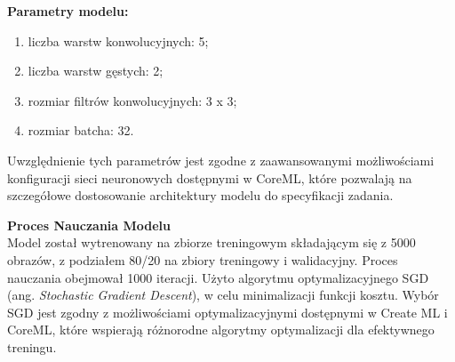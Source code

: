 \documentclass[12pt, a4paper, twoside, openany]{book}
\newcommand{\forceindent}{\leavevmode{\parindent=1.3em\indent}}
\begin{document}
\textbf{Parametry modelu:}
\begin{enumerate}[label=--]
    \item liczba warstw konwolucyjnych: 5;
    \item liczba warstw gęstych: 2;
    \item rozmiar filtrów konwolucyjnych: 3 x 3;
    \item rozmiar batcha: 32.
\end{enumerate}
\forceindent Uwzględnienie tych parametrów jest zgodne z zaawansowanymi możliwościami konfiguracji sieci neuronowych dostępnymi w CoreML, które pozwalają na szczegółowe dostosowanie architektury modelu do specyfikacji zadania.

\textbf{Proces Nauczania Modelu\\}
\forceindent Model został wytrenowany na zbiorze treningowym składającym się z 5000 obrazów, z podziałem 80/20 na zbiory treningowy i walidacyjny.
Proces nauczania obejmował 1000 iteracji.
Użyto algorytmu optymalizacyjnego SGD (ang. \textit{Stochastic Gradient Descent}), w celu minimalizacji funkcji kosztu.
Wybór SGD jest zgodny z możliwościami optymalizacyjnymi dostępnymi w Create ML i CoreML, które wspierają różnorodne algorytmy optymalizacji dla efektywnego treningu.
\end{document}

